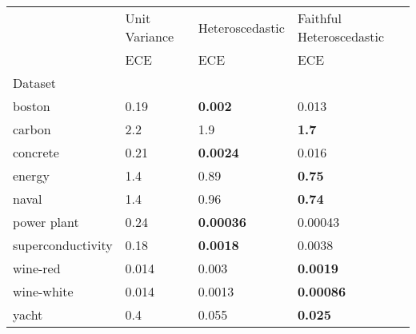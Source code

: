 \begin{tabular}{l|l|l|l}
\toprule
 & Unit Variance & Heteroscedastic & Faithful Heteroscedastic \\
 & ECE & ECE & ECE \\
Dataset &  &  &  \\
\midrule
boston & 0.19 & \bfseries 0.002 & 0.013 \\
carbon & 2.2 & 1.9 & \bfseries 1.7 \\
concrete & 0.21 & \bfseries 0.0024 & 0.016 \\
energy & 1.4 & 0.89 & \bfseries 0.75 \\
naval & 1.4 & 0.96 & \bfseries 0.74 \\
power plant & 0.24 & \bfseries 0.00036 & 0.00043 \\
superconductivity & 0.18 & \bfseries 0.0018 & 0.0038 \\
wine-red & 0.014 & 0.003 & \bfseries 0.0019 \\
wine-white & 0.014 & 0.0013 & \bfseries 0.00086 \\
yacht & 0.4 & 0.055 & \bfseries 0.025 \\
\bottomrule
\end{tabular}

